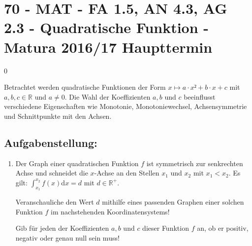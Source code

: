 \section{70 - MAT - FA 1.5, AN 4.3, AG 2.3 - Quadratische Funktion - Matura 2016/17 Haupttermin}

\begin{langesbeispiel} \item[0] %
	
Betrachtet werden quadratische Funktionen der Form $x\mapsto a\cdot x²+b\cdot x+c$ mit $a,b,c\in\mathbb{R}$ und $a\neq 0$. Die Wahl der Koeffizienten $a,b$ und $c$ beeinflusst verschiedene Eigenschaften wie Monotonie, Monotoniewechsel, Achsensymmetrie und Schnittpunkte mit den Achsen.

\subsection{Aufgabenstellung:}
\begin{enumerate}
	\item Der Graph einer quadratischen Funktion $f$ ist symmetrisch zur senkrechten Achse und schneidet die $x$-Achse an den Stellen $x_1$ und $x_2$ mit $x_1<x_2$. Es gilt: $\int^{x_2}_{x_1}{f(x)}$d$x=d$ mit $d\in\mathbb{R}^+$.
	
	Veranschauliche den Wert $d$ mithilfe eines passenden Graphen einer solchen Funktion $f$ im nachstehenden Koordinatensystems!
	
	\begin{center}
	\end{center}
	
	Gib für jeden der Koeffizienten $a,b$ und $c$ dieser Funktion $f$ an, ob er positiv, negativ oder genau null sein muss!\leer
	

\end{enumerate}
\end{langesbeispiel}
